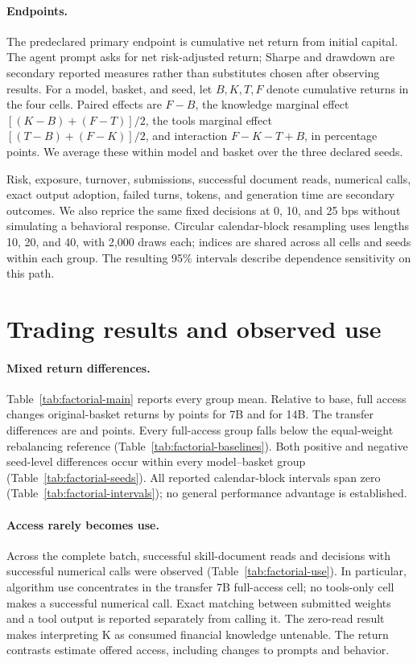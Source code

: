 \paragraph{Endpoints.}
The predeclared primary endpoint is cumulative net return from initial capital. The agent
prompt asks for net risk-adjusted return; Sharpe and drawdown are secondary reported
measures rather than substitutes chosen after observing results. For a model, basket,
and seed, let $B,K,T,F$ denote cumulative returns in the four cells. Paired effects are
$F-B$, the knowledge marginal effect $[(K-B)+(F-T)]/2$, the tools marginal effect
$[(T-B)+(F-K)]/2$, and interaction $F-K-T+B$, in percentage points. We average these
within model and basket over the three declared seeds.

Risk, exposure, turnover, submissions, successful document reads, numerical calls,
exact output adoption, failed turns, tokens, and generation time are secondary outcomes.
We also reprice the same fixed decisions at 0, 10, and 25 bps without simulating a
behavioral response. Circular calendar-block resampling uses lengths 10, 20, and 40,
with 2,000 draws each; indices are shared across all cells and seeds within each group.
The resulting 95\% intervals describe dependence sensitivity on this path.



\section{Trading results and observed use}
\paragraph{Mixed return differences.}
Table~\ref{tab:factorial-main} reports every group mean. Relative to base, full access
changes original-basket returns by \FTOriginalSevenDifference{} points for 7B and
\FTOriginalFourteenDifference{} for 14B. The transfer differences are
\FTTransferSevenDifference{} and \FTTransferFourteenDifference{} points. Every full-access
group falls below the equal-weight rebalancing reference
(Table~\ref{tab:factorial-baselines}). Both positive and negative seed-level differences
occur within every model--basket group (Table~\ref{tab:factorial-seeds}). All reported
calendar-block intervals span zero (Table~\ref{tab:factorial-intervals}); no general
performance advantage is established.

\paragraph{Access rarely becomes use.}
Across the complete batch, \FTSkillReads{} successful skill-document reads and
\FTAlgorithmDecisions{} decisions with successful numerical calls were observed
(Table~\ref{tab:factorial-use}). In particular, algorithm use concentrates in the transfer
7B full-access cell; no tools-only cell makes a successful numerical call. Exact matching
between submitted weights and a tool output is reported separately from calling it.
The zero-read result makes interpreting K as consumed financial knowledge untenable.
The return contrasts estimate offered access, including changes to prompts and behavior.


